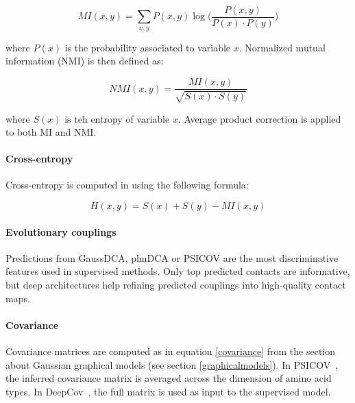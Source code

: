             \begin{equation}
                MI(x, y) = \sum\limits_{x, y} P(x, y) \log \Big( \frac{P(x, y)}{P(x) \cdot P(y)} \Big)
            \end{equation}

            where $P(x)$ is the probability associated to variable $x$.
            Normalized mutual information (NMI) is then defined as:

            \begin{equation}
                NMI(x, y) = \frac{MI(x, y)}{\sqrt{S(x) \cdot S(y)}}
            \end{equation}

            where $S(x)$ is teh entropy of variable $x$.
            Average product correction is applied to both MI and NMI.

        \paragraph{Cross-entropy}

            Cross-entropy is computed in \cite{Michel383133} using the following formula:

            \begin{equation}
                H(x, y) = S(x) + S(y) - MI(x, y)
            \end{equation}

        \paragraph{Evolutionary couplings}

            Predictions from GaussDCA, plmDCA or PSICOV are the most discriminative features
            used in supervised methods. Only top predicted contacts are informative, but deep
            architectures help refining predicted couplings into high-quality contact maps.

        \paragraph{Covariance}

            Covariance matrices are computed as in equation \ref{covariance} from the section
            about Gaussian graphical models (see section \ref{graphicalmodels}).
            In PSICOV~\cite{doi:10.1093/bioinformatics/btr638}, the inferred covariance
            matrix is averaged across the dimension of amino acid types.
            In DeepCov~\cite{doi:10.1093/bioinformatics/bty341}, the full matrix is used
            as input to the supervised model.

